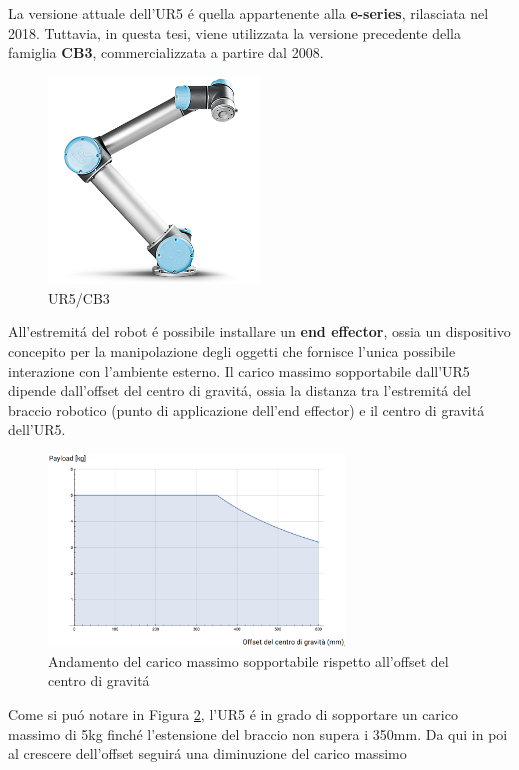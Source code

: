 La versione attuale dell'UR5 \'{e} quella appartenente alla \textbf{e-series}, rilasciata nel 2018. 
Tuttavia, in questa tesi, viene utilizzata la versione precedente della famiglia \textbf{CB3}, commercializzata a partire dal 
2008.
\begin{figure}[H]
    \centering
    \includegraphics*[width=0.5\textwidth]{images/ur5.png}
    \caption{UR5/CB3}
    \label{fig:ur5}
\end{figure}
All'estremit\'{a} del robot \'{e} possibile installare un \textbf{end effector}, ossia un dispositivo concepito 
per la manipolazione degli oggetti che fornisce l'unica possibile interazione con l'ambiente esterno.
Il carico massimo sopportabile dall'UR5 dipende dall'offset del centro di gravit\'{a}, ossia la distanza tra l'estremit\'{a}  
del braccio robotico (punto di applicazione dell'end effector) e il centro di gravit\'{a} dell'UR5. 
\begin{figure}[H]
    \centering
    \includegraphics*[width=0.7\textwidth]{images/payload.png}
    \caption{Andamento del carico massimo sopportabile rispetto all'offset del centro di gravit\'{a}}
    \label{fig:payload}
\end{figure}
Come si pu\'{o} notare in Figura \ref{fig:payload}, l'UR5 \'{e} in grado di sopportare un carico massimo di 5kg finch\'{e} 
l'estensione del braccio non supera i 350mm. Da qui in poi al crescere dell'offset seguir\'{a} una diminuzione del carico massimo 
